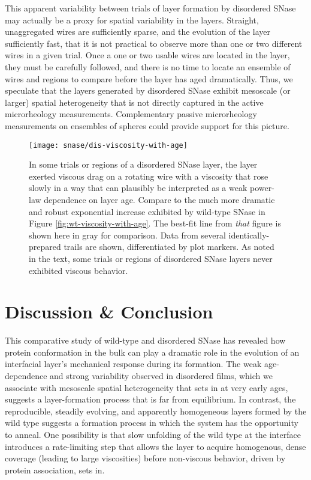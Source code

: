 This apparent variability between trials of layer formation by disordered SNase may actually be a proxy for spatial variability in the layers. Straight, unaggregated wires are sufficiently sparse, and the evolution of the layer sufficiently fast, that it is not practical to observe more than one or two different wires in a given trial. Once a one or two usable wires are located in the layer, they must be carefully followed, and there is no time to locate an ensemble of wires and regions to compare before the layer has aged dramatically. Thus, we speculate that the layers generated by disordered SNase exhibit mesoscale (or larger) spatial heterogeneity that is not directly captured in the active microrheology measurements. Complementary passive microrheology measurements on ensembles of spheres could provide support for this picture.

   \begin{figure}
    \centering
    \texttt{[image: snase/dis-viscosity-with-age]}
    \caption{\label{fig:dis-viscosity-with-age}In some trials or regions of a disordered SNase layer, the layer exerted viscous drag on a rotating wire with a viscosity that rose slowly in a way that can plausibly be interpreted as a weak power-law dependence on layer age. Compare to the much more dramatic and robust exponential increase exhibited by wild-type SNase in Figure \ref{fig:wt-viscosity-with-age}. The best-fit line from \emph{that} figure is shown here in gray for comparison. Data from several identically-prepared trails are shown, differentiated by plot markers. As noted in the text, some trials or regions of disordered SNase layers never exhibited viscous behavior.}
    \end{figure}


\section{Discussion \& Conclusion}

This comparative study of wild-type and disordered SNase has revealed how protein conformation in the bulk can play a dramatic role in the evolution of an interfacial layer's mechanical response during its formation. The weak age-dependence and strong variability observed in disordered films, which we associate with mesoscale spatial heterogeneity that sets in at very early ages, suggests a layer-formation process that is far from equilibrium. In contrast, the reproducible, steadily evolving, and apparently homogeneous layers formed by the wild type suggests a formation process in which the system has the opportunity to anneal. One possibility is that slow unfolding of the wild type at the interface introduces a rate-limiting step that allows the layer to acquire homogenous, dense coverage (leading to large viscosities) before non-viscous behavior, driven by protein association, sets in.